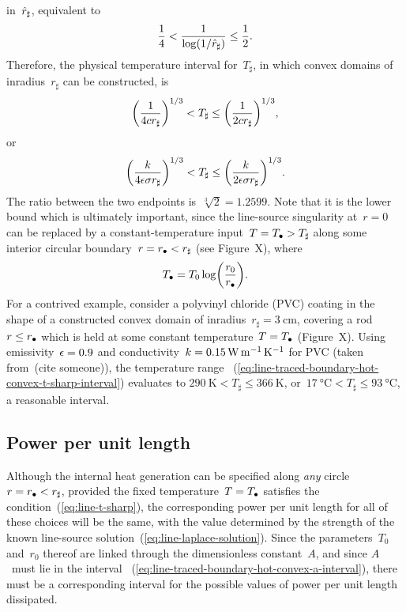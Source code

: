 in~$\hat{r}_\sharp$,
equivalent to
\begin{equation}
  \frac{1}{4} < \frac{1}{\log (1 / \hat{r}_\sharp)} \le \frac{1}{2}.
  \label{eq:line-traced-boundary-hot-convex-log-r-sharp-interval}
\end{equation}
Therefore, the physical temperature interval for~$T_\sharp$,
in which convex domains of inradius~$r_\sharp$ can be constructed,
is
\[
  \roundbr*{\frac{1}{4 c r_\sharp}}^{1/3}
    <
  T_\sharp
    \le
  \roundbr*{\frac{1}{2 c r_\sharp}}^{1/3},
\]
or
\begin{equation}
  \roundbr*{\frac{\conduc}{4 \emiss \stefan r_\sharp}}^{1/3}
    <
  T_\sharp
    \le
  \roundbr*{\frac{\conduc}{2 \emiss \stefan r_\sharp}}^{1/3}.
  \label{eq:line-traced-boundary-hot-convex-t-sharp-interval}
\end{equation}
The ratio between the two endpoints is~$\sqrt[3]{2} = 1.2599$.
Note that it is the lower bound which is ultimately important,
since the line-source singularity at~$r = 0$
can be replaced by a constant-temperature input~$T = T_\bullet > T_\sharp$
along some interior circular boundary~$r = r_\bullet < r_\sharp$
(see Figure~X), %
where
\begin{equation}
  T_\dir = T_0 \log \roundbr*{\frac{r_0}{r_\dir}}.
  \label{eq:line-equivalent-dirichlet-relation}
\end{equation}
For a contrived example,
consider a polyvinyl chloride (PVC) coating
in the shape of a constructed convex domain
of inradius~$r_\sharp = \SI{3}{\centi\metre}$,
covering a rod~$r \le r_\bullet$
which is held at some constant temperature~$T = T_\bullet$
(Figure~X). %
Using emissivity~$\epsilon = 0.9$
and conductivity~$k = \SI{0.15}{\watt \per\metre \per\kelvin}$
for PVC (taken from~(cite someone)), %
the temperature range~%
  (\ref{eq:line-traced-boundary-hot-convex-t-sharp-interval})
evaluates to $\SI{290}{\kelvin} < T_\sharp \le \SI{366}{\kelvin}$,
or~$\SI{17}{\degreeCelsius} < T_\sharp \le \SI{93}{\degreeCelsius}$,
a reasonable interval.

\subsection{Power per unit length}
\label{sec:line.physical.power}

Although the internal heat generation can be specified
along \emph{any} circle~$r = r_\bullet < r_\sharp$,
provided the fixed temperature~$T = T_\bullet$
satisfies the condition~(\ref{eq:line-t-sharp}),
the corresponding power per unit length
for all of these choices will be the same,
with the value determined by the strength
of the known line-source solution~(\ref{eq:line-laplace-solution}).
Since the parameters~$T_0$ and~$r_0$ thereof are linked
through the dimensionless constant~$A$,
and since $A$~must lie in the interval~%
  (\ref{eq:line-traced-boundary-hot-convex-a-interval}),
there must be a corresponding interval for the possible values of
power per unit length dissipated.

